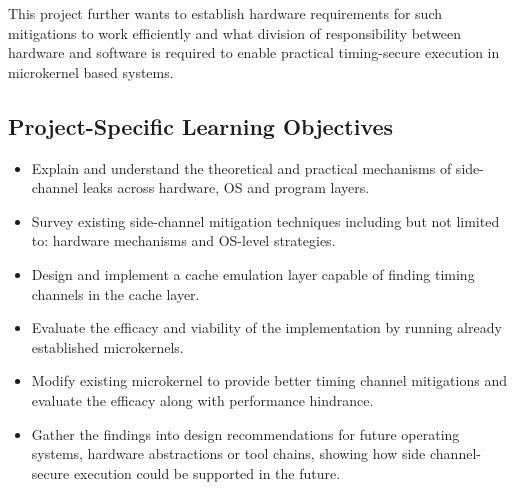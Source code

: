 This project further wants to establish hardware requirements for such
mitigations to work efficiently and what division of responsibility between
hardware and software is required to enable practical timing-secure execution
in microkernel based systems.

\subsection{Project-Specific Learning Objectives}
\begin{itemize}
  \item Explain and understand the theoretical and practical mechanisms of
    side-channel leaks across hardware, OS and program layers.
  \item Survey existing side-channel mitigation techniques including but not
    limited to: hardware mechanisms and OS-level strategies.
  \item Design and implement a cache emulation layer capable of finding timing
    channels in the cache layer.
  \item Evaluate the efficacy and viability of the implementation by running
    already established microkernels.
  \item Modify existing microkernel to provide better timing channel
    mitigations and evaluate the efficacy along with performance hindrance.
  \item Gather the findings into design recommendations for future operating
    systems, hardware abstractions or tool chains, showing how side channel-secure
    execution could be supported in the future. 
\end{itemize}

